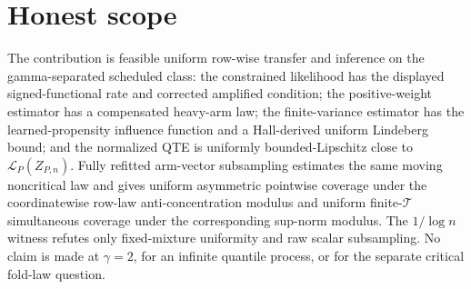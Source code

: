 \documentclass{article}
\begin{document}
\section{Honest scope}

The contribution is feasible uniform row-wise transfer and inference on the gamma-separated scheduled class: the constrained likelihood has the displayed signed-functional rate and corrected amplified condition; the positive-weight estimator has a compensated heavy-arm law; the finite-variance estimator has the learned-propensity influence function and a Hall-derived uniform Lindeberg bound; and the normalized QTE is uniformly bounded-Lipschitz close to \(\mathcal L_P(Z_{P,n})\). Fully refitted arm-vector subsampling estimates the same moving noncritical law and gives uniform asymmetric pointwise coverage under the coordinatewise row-law anti-concentration modulus and uniform finite-\(\mathcal T\) simultaneous coverage under the corresponding sup-norm modulus. The \(1/\log n\) witness refutes only fixed-mixture uniformity and raw scalar subsampling. No claim is made at \(\gamma=2\), for an infinite quantile process, or for the separate critical fold-law question.
\end{document}
